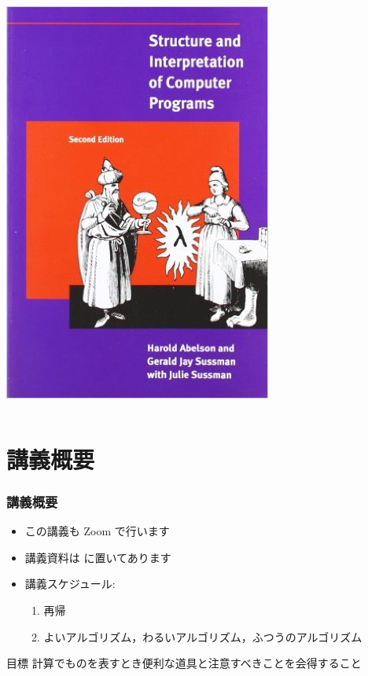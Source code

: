 \begin{frame}[shrink]
\begin{columns}[c]
\begin{column}{0.45\textwidth}
\includegraphics[scale=.25]{./Figure/SICP.jpg}
    \end{column}
  \end{columns}
\end{frame}
%
%
\section{講義概要}
\begin{frame}
\frametitle{講義概要}
  \begin{itemize}
\item この講義も Zoom で行います
\item 講義資料は \href{https://sites.google.com/presystems.xyz/elementaryCS/}{} に置いてあります
\item 講義スケジュール:
    \begin{enumerate}
\item 再帰
\item よいアルゴリズム，わるいアルゴリズム，ふつうのアルゴリズム
    \end{enumerate}
  \end{itemize}
  \begin{block}{目標}
計算でものを表すとき便利な道具と注意すべきことを会得すること
  \end{block}
\end{frame}
%
%
